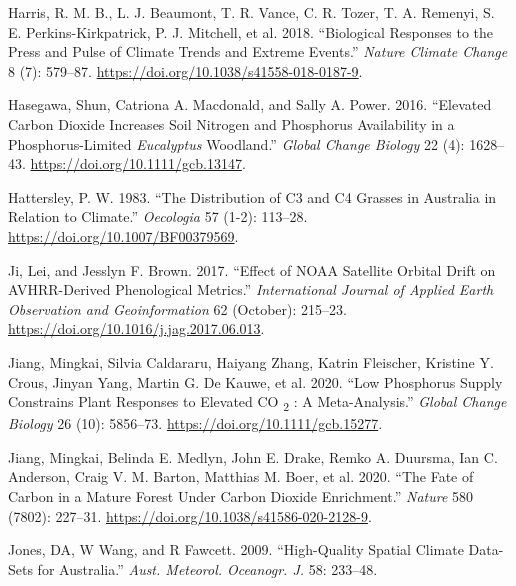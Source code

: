 \documentclass[
]{article}
\newlength{\cslhangindent}
\newlength{\cslentryspacingunit} %
\newenvironment{CSLReferences}[2] %
 {%
  \setlength{\parindent}{0pt}
  \ifodd #1
  \let\oldpar\par
  \def\par{\hangindent=\cslhangindent\oldpar}
  \fi
  \setlength{\parskip}{#2\cslentryspacingunit}
 }%
 {}
\begin{document}
\begin{CSLReferences}{1}{0}
\leavevmode{}%
Harris, R. M. B., L. J. Beaumont, T. R. Vance, C. R. Tozer, T. A.
Remenyi, S. E. Perkins-Kirkpatrick, P. J. Mitchell, et al. 2018.
{``Biological Responses to the Press and Pulse of Climate Trends and
Extreme Events.''} \emph{Nature Climate Change} 8 (7): 579--87.
\url{https://doi.org/10.1038/s41558-018-0187-9}.

\leavevmode{}%
Hasegawa, Shun, Catriona A. Macdonald, and Sally A. Power. 2016.
{``Elevated Carbon Dioxide Increases Soil Nitrogen and Phosphorus
Availability in a Phosphorus-Limited {\emph{Eucalyptus}} Woodland.''}
\emph{Global Change Biology} 22 (4): 1628--43.
\url{https://doi.org/10.1111/gcb.13147}.

\leavevmode{}%
Hattersley, P. W. 1983. {``The Distribution of {C3} and {C4} Grasses in
{Australia} in Relation to Climate.''} \emph{Oecologia} 57 (1-2):
113--28. \url{https://doi.org/10.1007/BF00379569}.

\leavevmode{}%
Ji, Lei, and Jesslyn F. Brown. 2017. {``Effect of {NOAA} Satellite
Orbital Drift on {AVHRR}-Derived Phenological Metrics.''}
\emph{International Journal of Applied Earth Observation and
Geoinformation} 62 (October): 215--23.
\url{https://doi.org/10.1016/j.jag.2017.06.013}.

\leavevmode{}%
Jiang, Mingkai, Silvia Caldararu, Haiyang Zhang, Katrin Fleischer,
Kristine Y. Crous, Jinyan Yang, Martin G. De Kauwe, et al. 2020. {``Low
Phosphorus Supply Constrains Plant Responses to Elevated {CO}
{\textsubscript{2}} : {A} Meta-Analysis.''} \emph{Global Change Biology}
26 (10): 5856--73. \url{https://doi.org/10.1111/gcb.15277}.

\leavevmode{}%
Jiang, Mingkai, Belinda E. Medlyn, John E. Drake, Remko A. Duursma, Ian
C. Anderson, Craig V. M. Barton, Matthias M. Boer, et al. 2020. {``The
Fate of Carbon in a Mature Forest Under Carbon Dioxide Enrichment.''}
\emph{Nature} 580 (7802): 227--31.
\url{https://doi.org/10.1038/s41586-020-2128-9}.

\leavevmode{}%
Jones, DA, W Wang, and R Fawcett. 2009. {``High-Quality Spatial Climate
Data-Sets for {Australia}.''} \emph{Aust. Meteorol. Oceanogr. J.} 58:
233--48.


\end{CSLReferences}
\end{document}
